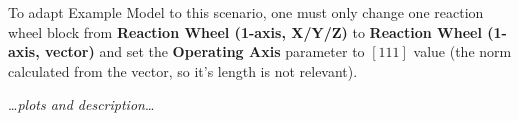         To adapt Example Model to this scenario, one must only change one reaction wheel block from \textbf{Reaction Wheel (1-axis, X/Y/Z)} to \textbf{Reaction Wheel (1-axis, vector)} and set the \textbf{Operating Axis} parameter to $[1 1 1]$ value (the norm calculated from the vector, so it's length is not relevant).


        \dots\textit{plots and description}\dots
